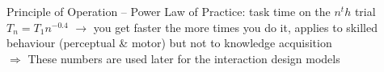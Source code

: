 Principle of Operation -- Power Law of Practice: task time on the $n^th$ trial $T_n = T_1n^{-0.4}$ $\rightarrow$ you get faster the more times you do it, applies to skilled behaviour (perceptual \& motor) but not to knowledge acquisition\\
$\Rightarrow$ These numbers are used later for the interaction design models
